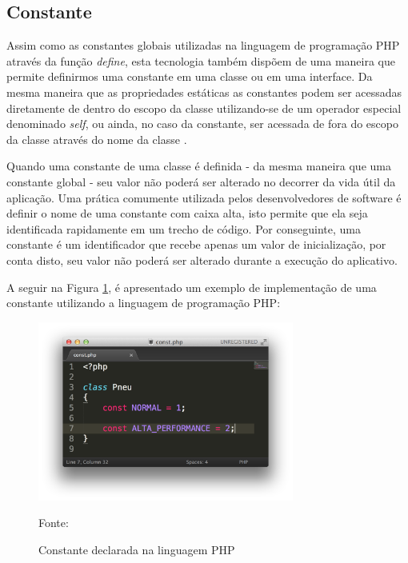 \subsection{Constante}

Assim como as constantes globais utilizadas na linguagem de programação
\acs{PHP} através da função \textit{define}, esta tecnologia também dispõem de
uma maneira que permite definirmos uma constante em uma classe ou em uma
interface. Da mesma maneira que as propriedades estáticas as constantes podem
ser acessadas diretamente de dentro do escopo da classe utilizando-se de um
operador especial denominado \textit{self}, ou ainda, no caso da constante, ser
acessada de fora do escopo da classe através do nome da classe \cite{programmingPhp}.

Quando uma constante de uma classe é definida - da mesma maneira que uma
constante global -  seu valor não poderá ser alterado no decorrer da vida útil
da aplicação. Uma prática comumente utilizada pelos desenvolvedores de software
é definir o nome de uma constante com caixa alta, isto permite que ela seja
identificada rapidamente em um trecho de código. Por conseguinte, uma constante
é um identificador que recebe apenas um valor de inicialização, por conta disto,
seu valor não poderá ser alterado durante a execução do aplicativo.

A seguir na Figura \ref{fig:constante}, é apresentado um exemplo de implementação
de uma constante utilizando a linguagem de programação \acs{PHP}:

\begin{figure}[h!tb]
	\caption{Constante declarada na linguagem PHP}
	\label{fig:constante}

	\centering
	\includegraphics[width=0.75\textwidth]{images/const.png}

	\centering
	\footnotesize Fonte: \fonteOAutor
\end{figure}

